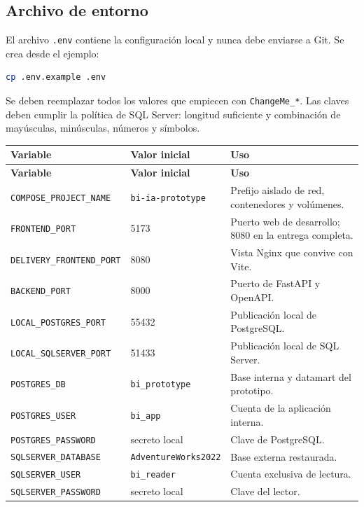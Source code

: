 \documentclass[11pt,letterpaper]{article}
\newcommand{\file}[1]{\texttt{#1}}
\begin{document}
\subsection{Archivo de entorno}

El archivo \file{.env} contiene la configuración local y nunca debe enviarse a Git. Se crea desde el ejemplo:

\begin{lstlisting}[style=terminal,language=bash]
cp .env.example .env
\end{lstlisting}

Se deben reemplazar todos los valores que empiecen con \file{ChangeMe\_*}. Las claves deben cumplir la política de SQL Server: longitud suficiente y combinación de mayúsculas, minúsculas, números y símbolos.

\begin{longtable}{@{}p{}p{}p{}@{}}
  \toprule
  \textbf{Variable} & \textbf{Valor inicial} & \textbf{Uso} \\
  \midrule
  \endfirsthead
  \toprule
  \textbf{Variable} & \textbf{Valor inicial} & \textbf{Uso} \\
  \midrule
  \endhead
  \file{COMPOSE\_PROJECT\_NAME} & \file{bi-ia-prototype} & Prefijo aislado de red, contenedores y volúmenes. \\
  \file{FRONTEND\_PORT} & 5173 & Puerto web de desarrollo; 8080 en la entrega completa. \\
  \file{DELIVERY\_FRONTEND\_PORT} & 8080 & Vista Nginx que convive con Vite. \\
  \file{BACKEND\_PORT} & 8000 & Puerto de FastAPI y OpenAPI. \\
  \file{LOCAL\_POSTGRES\_PORT} & 55432 & Publicación local de PostgreSQL. \\
  \file{LOCAL\_SQLSERVER\_PORT} & 51433 & Publicación local de SQL Server. \\
  \file{POSTGRES\_DB} & \file{bi\_prototype} & Base interna y datamart del prototipo. \\
  \file{POSTGRES\_USER} & \file{bi\_app} & Cuenta de la aplicación interna. \\
  \file{POSTGRES\_PASSWORD} & secreto local & Clave de PostgreSQL. \\
  \file{SQLSERVER\_DATABASE} & \file{AdventureWorks2022} & Base externa restaurada. \\
  \file{SQLSERVER\_USER} & \file{bi\_reader} & Cuenta exclusiva de lectura. \\
  \file{SQLSERVER\_PASSWORD} & secreto local & Clave del lector. \\

\end{longtable}
\end{document}
